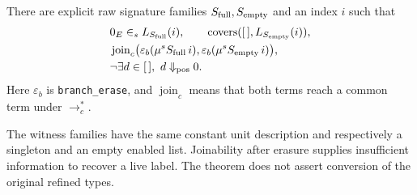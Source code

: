 \begin{theorem}
There are explicit raw signature families $S_{\rm full},S_{\rm empty}$ and an index $i$ such that
\begin{align*}
&0_E\in_s L_{S_{\rm full}}(i),\qquad
  \operatorname{covers}([\,],L_{S_{\rm empty}}(i)),\\
&\operatorname{join}_c\bigl(\varepsilon_b(\mu^s S_{\rm full}\,i),
                   \varepsilon_b(\mu^s S_{\rm empty}\,i)\bigr),\\
&\neg\exists d\in[\,],\ d\Downarrow_{\rm pos}0.
\end{align*}
Here $\varepsilon_b$ is \texttt{branch\_erase}, and $\operatorname{join}_c$ means that both terms reach a common term under $\longrightarrow_c^*$.
\end{theorem}
\noindent The witness families have the same constant unit description and respectively a singleton and an empty enabled list. Joinability after erasure supplies insufficient information to recover a live label. The theorem does not assert conversion of the original refined types.
